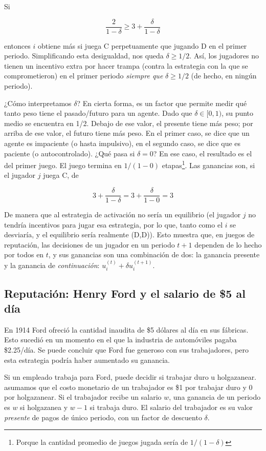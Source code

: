 \documentclass[12pt]{scrartcl}
\begin{document}
Si

\[
\frac{2}{1-\delta} \geq 3 + \frac{\delta}{1-\delta}
\]

entonces $i$ obtiene más si juega C perpetuamente que jugando D en el primer periodo. Simplificando esta desigualdad, nos queda $\delta \geq 1/2$. Así, los jugadores no tienen un incentivo extra por hacer trampa (contra la estrategia con la que se comprometieron) en el primer periodo \textit{siempre que} $\delta \geq 1/2$ (de hecho, en ningún periodo). 

¿Cómo interpretamos $\delta$? En cierta forma, es un factor que permite medir qué tanto peso tiene el pasado/futuro para un agente. Dado que $\delta \in [0, 1)$, su punto medio se encuentra en 1/2. Debajo de ese valor, el presente tiene más peso; por arriba de ese valor, el futuro tiene más peso. En el primer caso, se dice que un agente es impaciente (o hasta impulsivo), en el segundo caso, se dice que es paciente (o autocontrolado). ¿Qué pasa si $\delta = 0$? En ese caso, el resultado es el del primer juego. El juego termina en $1/(1-0)$ etapas\footnote{Porque la cantidad promedio de juegos jugada sería de $1/(1-\delta)$}. Las ganancias son, si el jugador $j$ juega C, de

\[ 3 + \frac{\delta}{1-\delta} = 3 + \frac{\delta}{1-0} = 3 \]

De manera que al estrategia de activación no sería un equilibrio (el jugador $j$ no tendría incentivos para jugar esa estrategia, por lo que, tanto como el $i$ se desviaría, y el equilibrio sería realmente (D,D)). Esto muestra que, en juegos de reputación, las decisiones de un jugador en un periodo $t+1$ dependen de lo hecho por todos en $t$, y sus ganancias son una combinación de dos: la ganancia presente y la ganancia de \textit{continuación}: $u_i^{(t)} + \delta u_i^{(t+1)}$.

\subsection{Reputación: Henry Ford y el salario de \$5 al día}

En 1914 Ford ofreció la cantidad inaudita de \$5 dólares al día en sus fábricas. Esto sucedió en un momento en el que la industria de automóviles pagaba \$2.25/día. Se puede concluir que Ford fue generoso con sus trabajadores, pero esta estrategia podría haber aumentado su ganancia.

Si un empleado trabaja para Ford, puede decidir si trabajar duro u holgazanear. asumamos que el costo monetario de un trabajador es \$1 por trabajar duro y 0 por holgazanear. Si el trabajador recibe un salario $w$, una ganancia de un periodo es $w$ si holgazanea y $w-1$ si trabaja duro. El salario del trabajador es su valor \textit{presente} de pagos de único periodo, con un factor de descuento $\delta$. 
\end{document}

